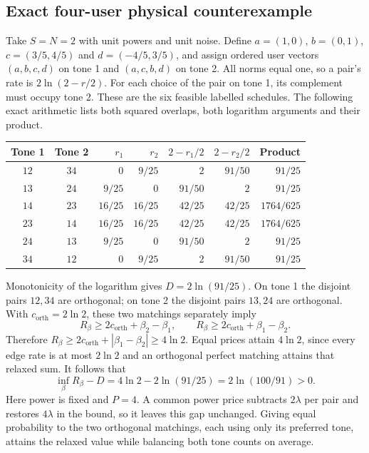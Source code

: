 \subsection{Exact four-user physical counterexample}
Take $S=N=2$ with unit powers and unit noise. Define
$a=(1,0)$, $b=(0,1)$, $c=(3/5,4/5)$ and $d=(-4/5,3/5)$, and assign ordered user vectors $(a,b,c,d)$ on tone 1 and $(a,c,b,d)$ on tone 2. All norms equal one, so a pair's rate is $2\ln(2-r/2)$. For each choice of the pair on tone 1, its complement must occupy tone 2. These are the six feasible labelled schedules. The following exact arithmetic lists both squared overlaps, both logarithm arguments and their product.
\begin{center}
\setlength{\tabcolsep}{7pt}
\begin{tabular}{ccrrrrr}
Tone 1 & Tone 2 & $r_1$ & $r_2$ & $2-r_1/2$ & $2-r_2/2$ & Product\\ \hline
$12$ & $34$ & $0$ & $9/25$ & $2$ & $91/50$ & $91/25$\\
$13$ & $24$ & $9/25$ & $0$ & $91/50$ & $2$ & $91/25$\\
$14$ & $23$ & $16/25$ & $16/25$ & $42/25$ & $42/25$ & $1764/625$\\
$23$ & $14$ & $16/25$ & $16/25$ & $42/25$ & $42/25$ & $1764/625$\\
$24$ & $13$ & $9/25$ & $0$ & $91/50$ & $2$ & $91/25$\\
$34$ & $12$ & $0$ & $9/25$ & $2$ & $91/50$ & $91/25$
\end{tabular}
\end{center}
Monotonicity of the logarithm gives $D=2\ln(91/25)$. On tone 1 the disjoint pairs $12,34$ are orthogonal; on tone 2 the disjoint pairs $13,24$ are orthogonal. With $c_{\mathrm{orth}}=2\ln2$, these two matchings separately imply
\begin{equation}
 R_\beta\ge2c_{\mathrm{orth}}+\beta_2-\beta_1,
 \qquad R_\beta\ge2c_{\mathrm{orth}}+\beta_1-\beta_2.
 \label{supp:four-user-prices}
\end{equation}
Therefore $R_\beta\ge2c_{\mathrm{orth}}+|\beta_1-\beta_2|\ge4\ln2$. Equal prices attain $4\ln2$, since every edge rate is at most $2\ln2$ and an orthogonal perfect matching attains that relaxed sum. It follows that
\begin{equation}
 \inf_\beta R_\beta-D=4\ln2-2\ln(91/25)=2\ln(100/91)>0.
 \label{supp:four-user-gap}
\end{equation}
Here power is fixed and $P=4$. A common power price subtracts $2\lambda$ per pair and restores $4\lambda$ in the bound, so it leaves this gap unchanged. Giving equal probability to the two orthogonal matchings, each using only its preferred tone, attains the relaxed value while balancing both tone counts on average.

